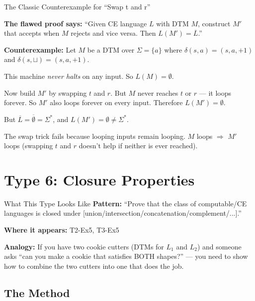 \documentclass[11pt,a4paper]{article}
\newcommand{\keytakeaway}[1]{%
  \par\vspace{0.3em}%
  \colorbox{yellow!60}{\parbox{\dimexpr\linewidth-2\fboxsep}{#1}}%
  \vspace{0.3em}}
\newcommand{\blank}{\sqcup}
\begin{document}
\begin{examplebox}{The Classic Counterexample for ``Swap t and r''}

\textbf{The flawed proof says:} ``Given CE language $L$ with DTM $M$, construct $M'$ that accepts when $M$ rejects and vice versa. Then $L(M') = \overline{L}$.''

\textbf{Counterexample:} Let $M$ be a DTM over $\Sigma = \{a\}$ where $\delta(s, a) = (s, a, +1)$ and $\delta(s, \blank) = (s, a, +1)$.

This machine \emph{never halts} on any input. So $L(M) = \emptyset$.

Now build $M'$ by swapping $t$ and $r$. But $M$ never reaches $t$ or $r$ --- it loops forever. So $M'$ also loops forever on every input. Therefore $L(M') = \emptyset$.

But $\overline{L} = \overline{\emptyset} = \Sigma^*$, and $L(M') = \emptyset \neq \Sigma^*$.

\keytakeaway{The swap trick fails because looping inputs remain looping. $M$ loops $\Rightarrow$ $M'$ loops (swapping $t$ and $r$ doesn't help if neither is ever reached).}
\end{examplebox}

\newpage
\section{Type 6: Closure Properties}

\begin{notebox}{What This Type Looks Like}
\textbf{Pattern:} ``Prove that the class of computable/CE languages is closed under [union/intersection/concatenation/complement/...].''

\textbf{Where it appears:} T2-Ex5, T3-Ex5

\textbf{Analogy:} If you have two cookie cutters (DTMs for $L_1$ and $L_2$) and someone asks ``can you make a cookie that satisfies BOTH shapes?'' --- you need to show how to combine the two cutters into one that does the job.
\end{notebox}

\subsection{The Method}
\end{document}
